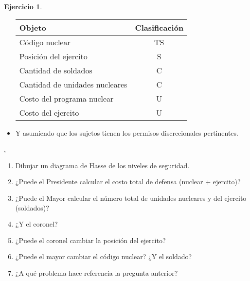 \documentclass{article}
\theoremstyle{definition}
\newtheorem{exercise}{Ejercicio}
\begin{document}
\begin{exercise}
\begin{itemize}
    \begin{tabular}{l|c}
      Objeto & Clasificación \\
      \hline
  Código nuclear & TS\\
  Posición del ejercito & S\\
  Cantidad de soldados & C\\
  Cantidad de unidades nucleares & C\\
  Costo del programa nuclear & U\\
  Costo del ejercito & U
    \end{tabular}
  \item Y asumiendo que los sujetos tienen los permisos discrecionales
    pertinentes.
  \end{itemize}, 
\begin{enumerate}
\itemsep0em 
  \item Dibujar un diagrama de Hasse de los niveles de seguridad.
  \item ¿Puede el Presidente calcular el costo total de defensa (nuclear + ejercito)?
  \item ¿Puede el Mayor calcular el número total de unidades nucleares y del
    ejercito (soldados)?
  \item ¿Y el coronel?
  \item ¿Puede el coronel cambiar la posición del ejercito? 
  \item ¿Puede el mayor cambiar el código nuclear? ¿Y el soldado?
  \item ¿A qué problema hace referencia la pregunta anterior?
\end{enumerate}
\end{exercise}
\end{document}
